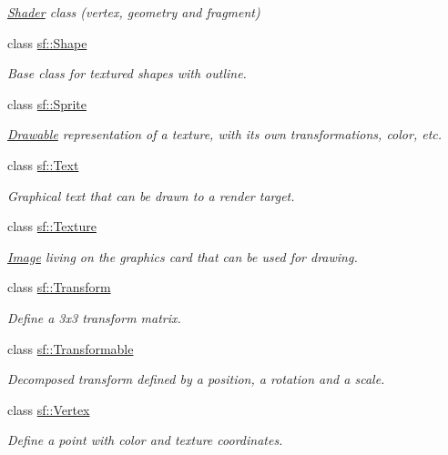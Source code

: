 \begin{DoxyCompactItemize}
\begin{DoxyCompactList}\small\item\em \mbox{\hyperlink{classsf_1_1_shader}{Shader}} class (vertex, geometry and fragment) \end{DoxyCompactList}\item 
class \mbox{\hyperlink{classsf_1_1_shape}{sf\+::\+Shape}}
\begin{DoxyCompactList}\small\item\em Base class for textured shapes with outline. \end{DoxyCompactList}\item 
class \mbox{\hyperlink{classsf_1_1_sprite}{sf\+::\+Sprite}}
\begin{DoxyCompactList}\small\item\em \mbox{\hyperlink{classsf_1_1_drawable}{Drawable}} representation of a texture, with its own transformations, color, etc. \end{DoxyCompactList}\item 
class \mbox{\hyperlink{classsf_1_1_text}{sf\+::\+Text}}
\begin{DoxyCompactList}\small\item\em Graphical text that can be drawn to a render target. \end{DoxyCompactList}\item 
class \mbox{\hyperlink{classsf_1_1_texture}{sf\+::\+Texture}}
\begin{DoxyCompactList}\small\item\em \mbox{\hyperlink{classsf_1_1_image}{Image}} living on the graphics card that can be used for drawing. \end{DoxyCompactList}\item 
class \mbox{\hyperlink{classsf_1_1_transform}{sf\+::\+Transform}}
\begin{DoxyCompactList}\small\item\em Define a 3x3 transform matrix. \end{DoxyCompactList}\item 
class \mbox{\hyperlink{classsf_1_1_transformable}{sf\+::\+Transformable}}
\begin{DoxyCompactList}\small\item\em Decomposed transform defined by a position, a rotation and a scale. \end{DoxyCompactList}\item 
class \mbox{\hyperlink{classsf_1_1_vertex}{sf\+::\+Vertex}}
\begin{DoxyCompactList}\small\item\em Define a point with color and texture coordinates. \end{DoxyCompactList}\item 

\end{DoxyCompactItemize}
